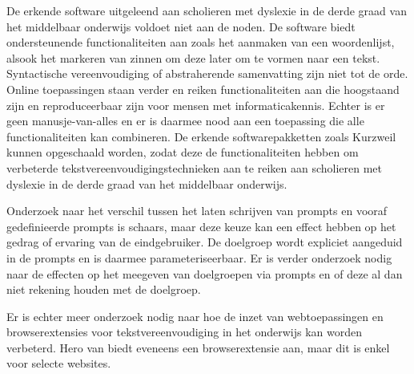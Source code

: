 De erkende software uitgeleend aan scholieren met dyslexie in de derde graad van het middelbaar onderwijs voldoet niet aan de noden. De software biedt ondersteunende functionaliteiten aan zoals het aanmaken van een woordenlijst, alsook het markeren van zinnen om deze later om te vormen naar een tekst. Syntactische vereenvoudiging of abstraherende samenvatting zijn niet tot de orde. Online toepassingen staan verder en reiken functionaliteiten aan die hoogstaand zijn en reproduceerbaar zijn voor mensen met informaticakennis. Echter is er geen manusje-van-alles en er is daarmee nood aan een toepassing die alle functionaliteiten kan combineren. De erkende softwarepakketten zoals Kurzweil kunnen opgeschaald worden, zodat deze de functionaliteiten hebben om verbeterde tekstvereenvoudigingstechnieken aan te reiken aan scholieren met dyslexie in de derde graad van het middelbaar onderwijs. 

Onderzoek naar het verschil tussen het laten schrijven van prompts en vooraf gedefinieerde prompts is schaars, maar deze keuze kan een effect hebben op het gedrag of ervaring van de eindgebruiker. De doelgroep wordt expliciet aangeduid in de prompts en is daarmee parameteriseerbaar. Er is verder onderzoek nodig naar de effecten op het meegeven van doelgroepen via prompts en of deze al dan niet rekening houden met de doelgroep. 

\medspace

Er is echter meer onderzoek nodig naar hoe de inzet van webtoepassingen en browserextensies voor tekstvereenvoudiging in het onderwijs kan worden verbeterd. Hero van \textcite{Bingel2018} biedt eveneens een browserextensie aan, maar dit is enkel voor selecte websites. 


 